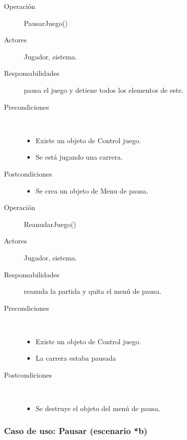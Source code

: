 \begin{description}
    \item [Operación] PausarJuego()
    \item [Actores] Jugador, sistema.
    \item [Responsabilidades] pausa el juego y detiene todos los elementos de este.
    \item [Precondiciones] $\quad$
        \begin{itemize}
            \item Existe un objeto de Control juego.
            \item Se está jugando una carrera.
        \end{itemize}
    \item [Postcondiciones]
        \begin{itemize}
            \item Se crea un objeto de Menu de pausa.
        \end{itemize}
\end{description}

\begin{description}
    \item [Operación] ReanudarJuego()
    \item [Actores] Jugador, sistema.
    \item [Responsabilidades] reanuda la partida y quita el menú de pausa.
    \item [Precondiciones] $\quad$
        \begin{itemize}
            \item Existe un objeto de Control juego.
            \item La carrera estaba pausada
        \end{itemize}
    \item [Postcondiciones] $\quad$
        \begin{itemize}
            \item Se destruye el objeto del menú de pausa.
        \end{itemize}
\end{description}

\subsubsection{Caso de uso: Pausar (escenario *b)}

